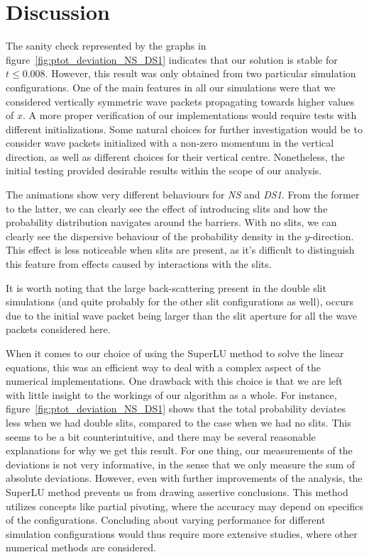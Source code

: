 \section{Discussion}\label{sec:discussion}

The sanity check represented by the graphs in figure~\ref{fig:ptot_deviation_NS_DS1} indicates that our solution is stable for $t\leq 0.008$. However, this result was only obtained from two particular simulation configurations. One of the main features in all our simulations were that we considered vertically symmetric wave packets propagating towards higher values of $x$. A more proper verification of our implementations would require tests with different initializations. Some natural choices for further investigation would be to consider wave packets initialized with a non-zero momentum in the vertical direction, as well as different choices for their vertical centre. Nonetheless, the initial testing provided desirable results within the scope of our analysis. 

The animations show very different behaviours for \textit{NS} and \textit{DS1}. From the former to the latter, we can clearly see the effect of introducing slits and how the probability distribution navigates around the barriers. With no slits, we can clearly see the dispersive behaviour of the probability density in the $y$-direction. This effect is less noticeable when slits are present, as it's difficult to distinguish this feature from effects caused by interactions with the slits. 

It is worth noting that the large back-scattering present in the double slit simulations (and quite probably for the other slit configurations as well), occurs due to the initial wave packet being larger than the slit aperture for all the wave packets considered here.

When it comes to our choice of using the SuperLU method to solve the linear equations, this was an efficient way to deal with a complex aspect of the numerical implementations. One drawback with this choice is that we are left with little insight to the workings of our algorithm as a whole. For instance, figure~\ref{fig:ptot_deviation_NS_DS1} shows that the total probability deviates less when we had double slits, compared to the case when we had no slits. This seems to be a bit counterintuitive, and there may be several reasonable explanations for why we get this result. For one thing, our measurements of the deviations is not very informative, in the sense that we only measure the sum of absolute deviations. However, even with further improvements of the analysis, the SuperLU method prevents us from drawing assertive conclusions. This method utilizes concepts like partial pivoting, where the accuracy may depend on specifics of the configurations. Concluding about varying performance for different simulation configurations would thus require more extensive studies, where other numerical methods are considered.        






